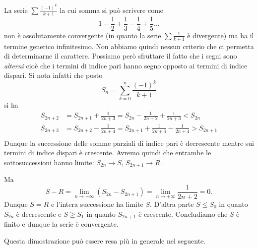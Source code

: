 La serie $\sum \frac{(-1)^k}{k+1}$ la cui somma si può scrivere come
%
%
\[
1 - \frac{1}{2} + \frac{1}{3} - \frac{1}{4} +  \frac{1}{5} \dots
\]
non è assolutamente convergente
(in quanto la serie $\sum \frac 1 {k+1}$ è divergente) ma ha il termine generico
infinitesimo. 
Non abbiamo quindi nessun criterio che ci permetta di
determinarne il carattere.
Possiamo però sfruttare il fatto che i segni sono \emph{alterni} cioè
che i termini di indice pari hanno segno opposto ai termini di indice dispari. 
Si nota infatti che posto
\[
  S_n = \sum_{k=0}^n \frac{(-1)^k}{k+1}
\]
si ha
\begin{align*}
S_{2n+2}
  &= S_{2n+1} + \frac{1}{2n+3}
  = S_{2n} - \frac{1}{2n+2} + \frac{1}{2n+3}
  < S_{2n}\\
S_{2n+3}
  &= S_{2n+2} - \frac{1}{2n+4}
  = S_{2n+1} + \frac{1}{2n+3} - \frac{1}{2n+4}
  > S_{2n+1} \\
\end{align*}
Dunque la successione delle somme parziali di indice pari è decrescente mentre
sui termini di indice dispari è crescente. Avremo quindi che entrambe
le sottosuccessioni hanno limite: $S_{2n} \to S$, $S_{2n+1} \to R$.

Ma
\[
  S - R = \lim_{n\to +\infty} (S_{2n} - S_{2n+1}) = \lim_{n\to+\infty}\frac{1}{2n+2} = 0.
\]
Dunque $S=R$ e l'intera successione ha limite $S$. 
D'altra parte $S \le S_0$ in quanto $S_{2n}$ è decrescente e $S\ge S_1$ in quanto $S_{2n+1}$ è crescente. 
Concludiamo che $S$ è finito e dunque la serie è convergente.%

Questa dimostrazione può essere resa più in generale nel seguente.

